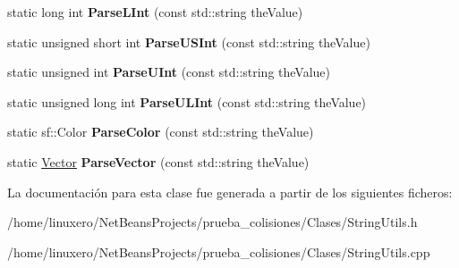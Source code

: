 \begin{DoxyCompactItemize}
\item 
\hypertarget{classStringUtils_ac073ad28199a96dff714526ab1913051}{static long int {\bfseries Parse\-L\-Int} (const std\-::string the\-Value)}\label{classStringUtils_ac073ad28199a96dff714526ab1913051}

\item 
\hypertarget{classStringUtils_a63c8b524bebf7ae667c248974e4afe68}{static unsigned short int {\bfseries Parse\-U\-S\-Int} (const std\-::string the\-Value)}\label{classStringUtils_a63c8b524bebf7ae667c248974e4afe68}

\item 
\hypertarget{classStringUtils_a416840a91aea78696aa5f13db5c3f61c}{static unsigned int {\bfseries Parse\-U\-Int} (const std\-::string the\-Value)}\label{classStringUtils_a416840a91aea78696aa5f13db5c3f61c}

\item 
\hypertarget{classStringUtils_abdf7501246277f13bcdd02c064df6e29}{static unsigned long int {\bfseries Parse\-U\-L\-Int} (const std\-::string the\-Value)}\label{classStringUtils_abdf7501246277f13bcdd02c064df6e29}

\item 
\hypertarget{classStringUtils_ae1e4e52dfaa87ba8f03d7ee88670fb08}{static sf\-::\-Color {\bfseries Parse\-Color} (const std\-::string the\-Value)}\label{classStringUtils_ae1e4e52dfaa87ba8f03d7ee88670fb08}

\item 
\hypertarget{classStringUtils_a5b6b599bb6b95d193b955fc21480cf8d}{static \hyperlink{classVector}{Vector} {\bfseries Parse\-Vector} (const std\-::string the\-Value)}\label{classStringUtils_a5b6b599bb6b95d193b955fc21480cf8d}

\end{DoxyCompactItemize}


La documentación para esta clase fue generada a partir de los siguientes ficheros\-:\begin{DoxyCompactItemize}
\item 
/home/linuxero/\-Net\-Beans\-Projects/prueba\-\_\-colisiones/\-Clases/String\-Utils.\-h\item 
/home/linuxero/\-Net\-Beans\-Projects/prueba\-\_\-colisiones/\-Clases/String\-Utils.\-cpp\end{DoxyCompactItemize}
